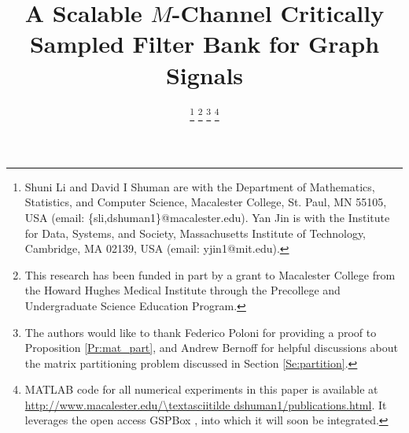 \documentclass[journal, 10pt]{IEEEtran}
\begin{document}
\title{
A Scalable $M$-Channel Critically Sampled Filter Bank for Graph Signals 
}
\author{
\thanks{Shuni Li and David I Shuman are with the Department of Mathematics, Statistics, and Computer Science, Macalester College, St. Paul, MN 55105, USA (email: \{sli,dshuman1\}@macalester.edu). Yan Jin is with the Institute for Data, Systems, and Society, Massachusetts Institute of Technology, Cambridge, MA 02139, USA (email: yjin1@mit.edu). }
\thanks{This research has been funded in part by a grant to Macalester College from the Howard Hughes Medical Institute through the Precollege and Undergraduate Science Education Program.}
\thanks{The authors would like to thank Federico Poloni for providing a proof to Proposition \ref{Pr:mat_part}, and Andrew Bernoff for helpful discussions about the matrix partitioning problem discussed in Section \ref{Se:partition}.}
\thanks{MATLAB code for all numerical experiments in this paper is available at \url{http://www.macalester.edu/\textasciitilde dshuman1/publications.html}. It leverages the open access GSPBox \cite{gspbox}, into which it will soon be integrated.}}

\maketitle

\end{document}
